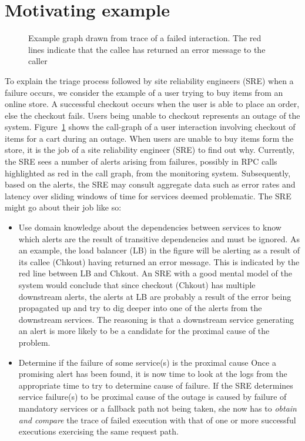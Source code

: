 \section{Motivating example}
\begin{figure}[h]
\caption{Example graph drawn from trace of a failed interaction. The red lines indicate that the callee has returned an error message to the caller}
\label{Failed_ex}
\end{figure}

To explain the triage process followed by site reliability engineers (SRE) when a failure occurs, we consider the example of a user trying to buy items from an online store. A successful checkout occurs when the user is able to place an order, else the checkout fails. Users being unable to checkout represents an outage of the system. Figure~\ref{Failed_ex} shows the  call-graph of a user interaction involving checkout of items for a cart during an outage. When users are unable to buy items form the store, it is the job of a site reliability engineer (SRE) to find out why. 
Currently, the SRE sees a number of alerts arising from failures, possibly in RPC calls highlighted as red in the call graph, from the monitoring system.  Subsequently, based on the alerts, the SRE may consult aggregate data such as error rates and latency over sliding windows of time for services deemed problematic.
The SRE might go about their job like so:
\begin{itemize}
\item Use domain knowledge about the dependencies between services to know which alerts are the result of transitive dependencies and must be ignored. \newline
As an example, the load balancer (LB) in the figure will be alerting as a result of its callee (Chkout) having returned an error message. This is indicated by the red line between LB and Chkout.  
An SRE with a good mental model of the system would conclude that since checkout (Chkout) has multiple downstream alerts, the alerts at LB are probably a result of the error being propagated up and try to dig deeper into one of the alerts from the downstream services. The reasoning is that a downstream service generating an alert is more likely to be a candidate for the proximal cause of the problem.  
\item Determine if the failure of some service(s) is the proximal cause \newline
Once a promising alert has been found, it is now time to look at the logs from the appropriate time to try to determine cause of failure. If the SRE determines service failure(s) to be proximal cause of the outage is caused by failure of mandatory services or a fallback path not being taken, she now has to \emph{obtain and compare} the trace of failed execution with that of one or more successful executions exercising the same request path. 
\end{itemize}

